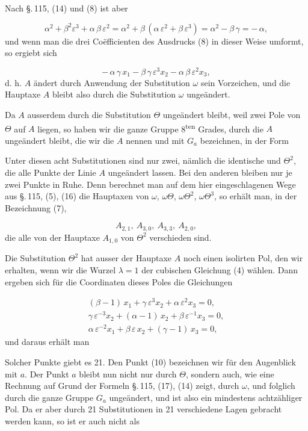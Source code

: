 Nach \S.\,115, (14) und (8) ist aber

\[
\alpha^2 + \beta^2\varepsilon^3 + \alpha\,\beta\,\varepsilon^2 = \alpha^2 + \beta\,(\alpha\,\varepsilon^2 + \beta\,\varepsilon^3) = \alpha^2 - \beta\,\gamma = -\,\alpha,
\]
und wenn man die drei Co\"efficienten des Ausdrucks (8) in dieser Weise umformt, so ergiebt sich

\[
-\,\alpha\,\gamma\,x_1 - \beta\,\gamma\,\varepsilon^3 x_2 - \alpha\,\beta\,\varepsilon^2 x_3,
\]
d. h. $A$ \"andert durch Anwendung der Substitution $\omega$ sein Vorzeichen, und die Hauptaxe $A$ bleibt also durch die Substitution $\omega$ unge\"andert.

Da $A$ ausserdem durch die Substitution $\Theta$ unge\"andert bleibt, weil zwei Pole von $\Theta$ auf $A$ liegen, so haben wir die ganze Gruppe 8\textsuperscript{ten} Grades, durch die $A$ unge\"andert bleibt, die wir die  $A$ nennen und mit $G_a$ bezeichnen, in der Form

Unter diesen acht Substitutionen sind nur zwei, n\"amlich die identische und $\Theta^2$, die alle Punkte der Linie $A$ unge\"andert lassen. Bei den anderen bleiben nur je zwei Punkte in Ruhe. Denn berechnet man auf dem hier eingeschlagenen Wege aus \S.\,115, (5), (16) die Hauptaxen von $\omega$, $\omega\Theta$, $\omega\Theta^2$, $\omega\Theta^3$, so erh\"alt man, in der Bezeichnung (7),

\[
A_{2,1},\ A_{3,0},\ A_{3,3},\ A_{2,0},
\]
die alle von der Hauptaxe $A_{1,0}$ von $\Theta^2$ verschieden sind.

Die Substitution $\Theta^2$ hat ausser der Hauptaxe $A$ noch einen isolirten Pol, den wir erhalten, wenn wir die Wurzel $\lambda = 1$ der cubischen Gleichung (4) w\"ahlen. Dann ergeben sich f\"ur die Coordinaten dieses Poles die Gleichungen

\[
\begin{array}{l}
(\beta-1)\,x_1 + \gamma\,\varepsilon^3 x_2 + \alpha\,\varepsilon^2 x_3 = 0,\\
\gamma\,\varepsilon^{-3} x_2 + (\alpha-1)\,x_2 + \beta\,\varepsilon^{-1} x_3 = 0,\\ %
\alpha\,\varepsilon^{-2} x_1 + \beta\,\varepsilon\, x_2 + (\gamma-1)\,x_3 = 0,
\end{array}
\]
und daraus erh\"alt man

Solcher Punkte giebt es 21. Den Punkt (10) bezeichnen wir f\"ur den Augenblick mit $a$. Der Punkt $a$ bleibt nun nicht nur durch $\Theta$, sondern auch, wie eine Rechnung auf Grund der Formeln \S.\,115, (17), (14) zeigt, durch $\omega$, und folglich durch die ganze Gruppe $G_a$ unge\"andert, und ist also ein mindestens achtz\"ahliger Pol. Da er aber durch 21 Substitutionen in 21 verschiedene Lagen gebracht werden kann, so ist er auch nicht  als

